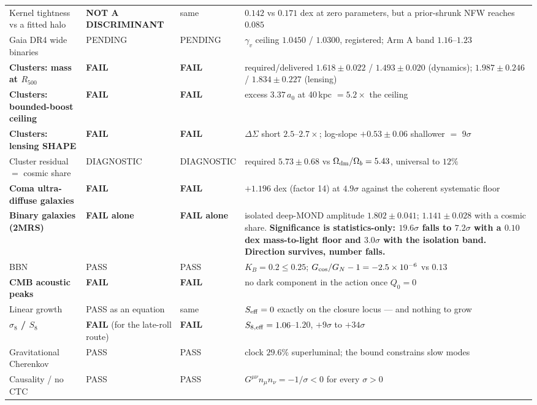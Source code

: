 \documentclass[11pt,letterpaper]{article}
\begin{document}
\begin{small}
\begin{longtable}{L{0.205\textwidth}L{0.145\textwidth}L{0.14\textwidth}L{0.37\textwidth}}
Kernel tightness vs a fitted halo & \textbf{NOT A DISCRIMINANT} & same & $0.142$ vs $0.171$ dex at zero parameters, but a prior-shrunk NFW reaches $0.085$\\
Gaia DR4 wide binaries & PENDING & PENDING & $\gamma_v$ ceiling $1.0450$ / $1.0300$, registered; Arm A band $1.16$--$1.23$\\
\textbf{Clusters: mass at $R_{500}$} & \textbf{FAIL} & \textbf{FAIL} & required/delivered $1.618\pm0.022$ / $1.493\pm0.020$ (dynamics); $1.987\pm0.246$ / $1.834\pm0.227$ (lensing)\\
\textbf{Clusters: bounded-boost ceiling} & \textbf{FAIL} & \textbf{FAIL} & excess $3.37\,a_0$ at 40\,kpc $=5.2\times$ the ceiling\\
\textbf{Clusters: lensing SHAPE} & \textbf{FAIL} & \textbf{FAIL} & $\Delta\Sigma$ short $2.5$--$2.7\times$; log-slope $+0.53\pm0.06$ shallower $=$ \textbf{$9\sigma$}\\
Cluster residual $=$ cosmic share & DIAGNOSTIC & DIAGNOSTIC & required $5.73\pm0.68$ vs $\Omega_{\rm dm}/\Omega_b=5.43$, universal to $12\%$\\
\textbf{Coma ultra-diffuse galaxies} & \textbf{FAIL} & \textbf{FAIL} & $+1.196$ dex (factor 14) at \textbf{$4.9\sigma$} against the coherent systematic floor\\
\textbf{Binary galaxies (2MRS)} & \textbf{FAIL alone} & \textbf{FAIL alone} & isolated deep-MOND amplitude $1.802\pm0.041$; $1.141\pm0.028$ with a cosmic share. \textbf{Significance is statistics-only: $19.6\sigma$ falls to $7.2\sigma$ with a $0.10$ dex mass-to-light floor and $3.0\sigma$ with the isolation band. Direction survives, number falls.}\\
BBN & PASS & PASS & $K_B=0.2\le0.25$; $G_{\rm cos}/G_N-1=-2.5\times10^{-6}$ vs $0.13$\\
\textbf{CMB acoustic peaks} & \textbf{FAIL} & \textbf{FAIL} & no dark component in the action once $Q_0=0$\\
Linear growth & PASS as an equation & same & $S_{\rm eff}=0$ exactly on the closure locus --- and nothing to grow\\
\textbf{$\sigma_8$ / $S_8$} & \textbf{FAIL} (for the late-roll route) & \textbf{FAIL} & $S_{8,\rm eff}=1.06$--$1.20$, $+9\sigma$ to $+34\sigma$\\
Gravitational Cherenkov & PASS & PASS & clock $29.6\%$ superluminal; the bound constrains slow modes\\
Causality / no CTC & PASS & PASS & $G^{\mu\nu}n_\mu n_\nu=-1/\sigma<0$ for every $\sigma>0$\\

\end{longtable}
\end{small}
\end{document}
